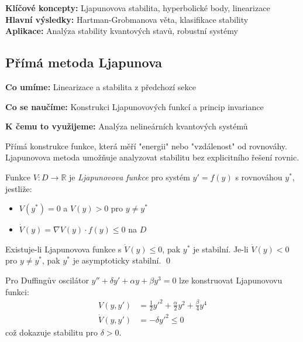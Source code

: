 \begin{summary}
\textbf{Klíčové koncepty:} Ljapunovova stabilita, hyperbolické body, linearizace \\
\textbf{Hlavní výsledky:} Hartman-Grobmanova věta, klasifikace stability \\
\textbf{Aplikace:} Analýza stability kvantových stavů, robustní systémy
\end{summary}

\spc

\subsection{Přímá metoda Ljapunova}

\begin{scaffold}
\item[] \textbf{Co umíme:} Linearizace a stabilita z předchozí sekce
\item[] \textbf{Co se naučíme:} Konstrukci Ljapunovových funkcí a princip invariance  
\item[] \textbf{K čemu to využijeme:} Analýza nelineárních kvantových systémů
\end{scaffold}

\begin{motivation}
Přímá konstrukce funkce, která měří "energii" nebo "vzdálenost" od rovnováhy. Ljapunovova metoda umožňuje analyzovat stabilitu bez explicitního řešení rovnic.
\end{motivation}

\begin{definition}
Funkce $V: D \to \mathbb{R}$ je \emph{Ljapunovova funkce} pro systém $y' = f(y)$ s rovnováhou $y^*$, jestliže:
\begin{itemize}
\item $V(y^*) = 0$ a $V(y) > 0$ pro $y \neq y^*$
\item $\dot{V}(y) = \nabla V(y) \cdot f(y) \leq 0$ na $D$
\end{itemize}
\end{definition}

\begin{theorem}
Existuje-li Ljapunovova funkce s $\dot{V}(y) \leq 0$, pak $y^*$ je stabilní. Je-li $\dot{V}(y) < 0$ pro $y \neq y^*$, pak $y^*$ je asymptoticky stabilní.
\qed
\end{theorem}

\begin{example}
Pro Duffingův oscilátor $y'' + \delta y' + \alpha y + \beta y^3 = 0$ lze konstruovat Ljapunovovu funkci:
\begin{align*}
V(y,y') &= \frac{1}{2}y'^2 + \frac{\alpha}{2}y^2 + \frac{\beta}{4}y^4 \\
\dot{V}(y,y') &= -\delta y'^2 \leq 0
\end{align*}
což dokazuje stabilitu pro $\delta > 0$.
\end{example}

